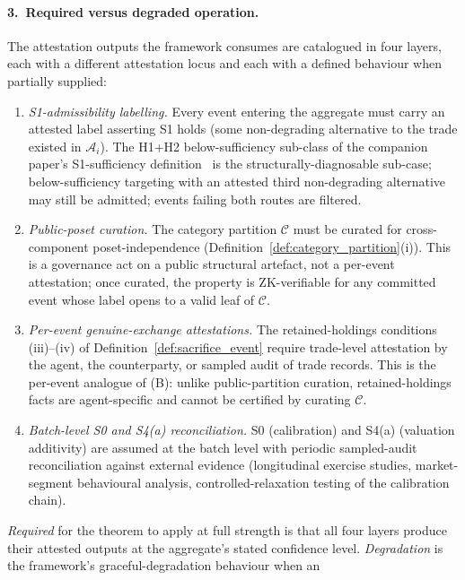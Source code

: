 \begin{remark}
\paragraph{3.~Required versus degraded operation.}
The attestation outputs the framework consumes are catalogued
in four layers, each with a different attestation locus and
each with a defined behaviour when partially supplied:
\begin{enumerate}
\item[(A)] \emph{S1-admissibility labelling.}  Every event
  entering the aggregate must carry an attested label asserting
  S1 holds (some non-degrading alternative to the trade
  existed in $\mathcal{A}_i$).  The H1+H2 below-sufficiency
  sub-class of the companion paper's S1-sufficiency
  definition~\citep[Need~Sufficiency]{lasser2026paper8b}
  is the structurally-diagnosable sub-case;
  below-sufficiency targeting with an attested third
  non-degrading alternative may still be admitted; events
  failing both routes are filtered.
\item[(B)] \emph{Public-poset curation.}  The category
  partition $\mathcal{C}$ must be curated for cross-component
  poset-independence (Definition~\ref{def:category_partition}(i)).
  This is a governance act on a public structural artefact, not
  a per-event attestation; once curated, the property is
  ZK-verifiable for any committed event whose label opens to a
  valid leaf of $\mathcal{C}$.
\item[(C)] \emph{Per-event genuine-exchange attestations.}
  The retained-holdings conditions (iii)--(iv) of
  Definition~\ref{def:sacrifice_event} require trade-level
  attestation by the agent, the counterparty, or sampled audit
  of trade records.  This is the per-event analogue of (B):
  unlike public-partition curation, retained-holdings facts are
  agent-specific and cannot be certified by curating
  $\mathcal{C}$.
\item[(D)] \emph{Batch-level S0 and S4(a) reconciliation.}
  S0 (calibration) and S4(a) (valuation additivity) are
  assumed at the batch level with periodic sampled-audit
  reconciliation against external evidence (longitudinal
  exercise studies, market-segment behavioural analysis,
  controlled-relaxation testing of the calibration chain).
\end{enumerate}
\emph{Required} for the theorem to apply at full strength is
that all four layers produce their attested outputs at the
aggregate's stated confidence level.  \emph{Degradation} is
the framework's graceful-degradation behaviour when an

\end{remark}
